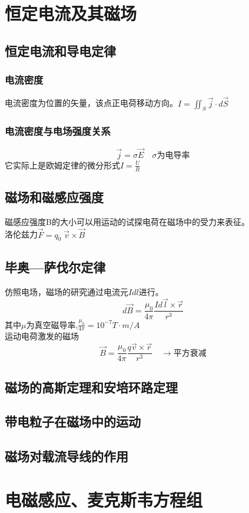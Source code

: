\documentclass{article}
\begin{document}
    \section{恒定电流及其磁场}
    \subsection{恒定电流和导电定律}
    \subsubsection{电流密度}
    电流密度为位置的矢量，该点正电荷移动方向。$I=\iint_S \vec{j}\cdot d\vec{S}$\\
    \subsubsection{电流密度与电场强度关系}
    \[
        \vec{j}=\sigma \vec{E}\quad \sigma \text{为电导率}  
    \]
    它实际上是欧姆定律的微分形式$I=\frac{U}{R}$
    \subsection{磁场和磁感应强度}
    磁感应强度B的大小可以用运动的试探电荷在磁场中的受力来表征。\\
    洛伦兹力$\vec{F}=q_0 \; \vec{v} \times \vec{B}$\\
    \subsection{毕奥—萨伐尔定律}
    仿照电场，磁场的研究通过电流元$Idl$进行。
    \[
      d\vec{B}=\frac{\mu_0}{4\pi} \frac{Id \vec{l} \times \vec{r}}{r^3}  
    \]
    其中$\mu$为真空磁导率,$\frac{\mu_0}{4\pi}=10^{-7}T\cdot m/A$\\
    运动电荷激发的磁场
    \[
    \vec{B}=\frac{\mu_0}{4\pi}\frac{q\vec{v} \times \vec{r}}{r^3}\quad \rightarrow \text{平方衰减}    
    \]
    \subsection{磁场的高斯定理和安培环路定理}
    \subsection{带电粒子在磁场中的运动}
    \subsection{磁场对载流导线的作用}
    \section{电磁感应、麦克斯韦方程组}
\end{document}
